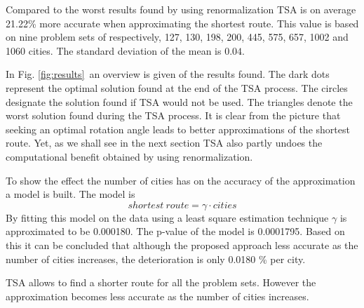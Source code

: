 Compared to the worst results found by using renormalization TSA is on average
21.22\% more accurate when approximating the shortest route. This value is
based on nine problem sets of respectively, 127, 130, 198, 200, 445, 575, 657,
1002 and 1060 cities. The standard deviation of the mean is $0.04$. 

In Fig. \ref{fig:results}~an overview is given of the results found. The
dark dots represent the optimal solution found at the end of the TSA process.
The circles designate the solution found if TSA would not be used. The
triangles denote the worst solution found during the TSA process. It is clear
from the picture that seeking an optimal rotation angle leads to better
approximations of the shortest route. Yet, as we shall see in the next section
TSA also partly undoes the computational benefit obtained by using renormalization.

To show the effect the number of cities has on the accuracy of the approximation a
model is built. The model is 
\[ 
	shortest~route = \gamma \cdot cities 
\]
By fitting this model on the data using a least square estimation technique
$\gamma$ is approximated to be 0.000180. The p-value of the model is
0.0001795. Based on this it can be concluded that although the proposed
approach less accurate as the number of cities increases, the deterioration is
only 0.0180 \% per city.

TSA allows to find a shorter route for all the problem sets. However the
approximation becomes less accurate as the number of cities increases. 



